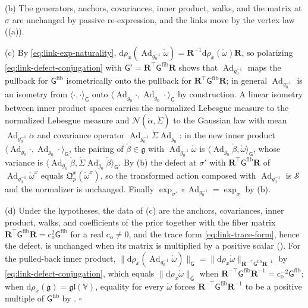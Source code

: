 (b) The generators, anchors, covariances, inner product, walks, and the matrix at $\sigma$ are unchanged
by passive re-expression, and the links move by the vertex law ((a)).

(c) By \cref{eq:link-exp-naturality},
$\mathrm d\rho_x(\operatorname{Ad}_{g_0^{-1}}\mathring\omega)=\mathbf R^{-1}\mathrm d\rho_x(\mathring\omega)\mathbf R$,
so polarizing \cref{eq:link-defect-conjugation} with $\mathsf G'=\mathbf R^\top\mathsf G^{\mathrm{fib}}\mathbf R$
shows that $\operatorname{Ad}_{g_0^{-1}}$ maps the pullback for $\mathsf G^{\mathrm{fib}}$ isometrically onto
the pullback for $\mathbf R^\top\mathsf G^{\mathrm{fib}}\mathbf R$; in general $\operatorname{Ad}_{g_0^{-1}}$
is an isometry from $\langle\cdot,\cdot\rangle_{\mathsf G}$ onto
$\langle\operatorname{Ad}_{g_0}\cdot,\operatorname{Ad}_{g_0}\cdot\rangle_{\mathsf G}$ by construction. A linear
isometry between inner product spaces carries the normalized Lebesgue measure to the normalized Lebesgue
measure and $\mathcal N(\mathring\alpha,\mathring\Sigma)$ to the Gaussian law with mean
$\operatorname{Ad}_{g_0^{-1}}\mathring\alpha$ and covariance operator
$\operatorname{Ad}_{g_0^{-1}}\mathring\Sigma\operatorname{Ad}_{g_0}$: in the new inner product
$\langle\operatorname{Ad}_{g_0}\cdot,\operatorname{Ad}_{g_0}\cdot\rangle_{\mathsf G}$, the pairing of
$\mathring\beta\in\mathfrak g$ with $\operatorname{Ad}_{g_0^{-1}}\mathring\omega$ is
$\langle\operatorname{Ad}_{g_0}\mathring\beta,\mathring\omega\rangle_{\mathsf G}$, whose variance is
$\langle\operatorname{Ad}_{g_0}\mathring\beta,\mathring\Sigma\operatorname{Ad}_{g_0}\mathring\beta\rangle_{\mathsf G}$. By (b) the defect at $\sigma'$ with
$\mathbf R^\top\mathsf G^{\mathrm{fib}}\mathbf R$ of $\operatorname{Ad}_{g_0^{-1}}\mathring\omega^x$ equals
$\mathfrak Q^x_p(\mathring\omega^x)$, so the transformed action composed with
$\operatorname{Ad}_{g_0^{-1}}$ is $\mathscr S$ and the normalizer is unchanged. Finally
$\exp_{\sigma'}\circ\operatorname{Ad}_{g_0^{-1}}=\exp_\sigma$ by (b).

(d) Under the hypotheses, the data of (c) are the anchors, covariances, inner product, walks, and
coefficients of the prior together with the fiber matrix
$\mathbf R^\top\mathsf G^{\mathrm{fib}}\mathbf R=\mathrm c_{\mathrm o}^2\mathsf G^{\mathrm{fib}}$ for a real
$\mathrm c_{\mathrm o}\neq0$, and the trace form \cref{eq:link-trace-form}, hence the defect,
is unchanged when its matrix is multiplied by a positive scalar (). For
the pulled-back inner product,
$\lVert\mathrm d\rho_x(\operatorname{Ad}_{g_0^{-1}}\mathring\omega)\rVert_{\mathsf G}
=\lVert\mathrm d\rho_x\mathring\omega\rVert_{\mathbf R^{-\top}\mathsf G^{\mathrm{fib}}\mathbf R^{-1}}$ by
\cref{eq:link-defect-conjugation}, which equals $\lVert\mathrm d\rho_x\mathring\omega\rVert_{\mathsf G}$ when
$\mathbf R^{-\top}\mathsf G^{\mathrm{fib}}\mathbf R^{-1}=\mathrm c_{\mathrm o}^{-2}\mathsf G^{\mathrm{fib}}$; when
$\mathrm d\rho_x(\mathfrak g)=\mathfrak{gl}(\mathbb V)$, equality for every $\mathring\omega$ forces
$\mathbf R^{-\top}\mathsf G^{\mathrm{fib}}\mathbf R^{-1}$ to be a positive multiple of
$\mathsf G^{\mathrm{fib}}$ by . \hfill$\square$

